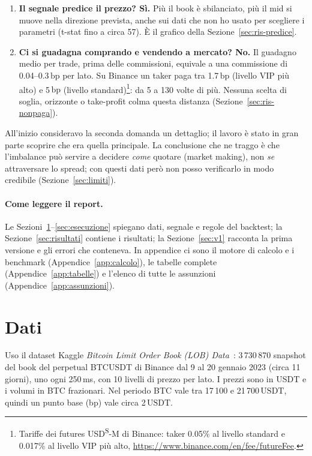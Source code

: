 \documentclass[a4paper,11pt]{article}
\newcommand{\bp}{\ensuremath{\,\mathrm{bp}}}
\newcommand{\usdt}{\ensuremath{\,\mathrm{USDT}}}
\begin{document}
\begin{enumerate}[leftmargin=*]
  \item \textbf{Il segnale predice il prezzo? Sì.} Più il book è sbilanciato, più il mid si
        muove nella direzione prevista, anche sui dati che non ho usato per scegliere i
        parametri (t-stat fino a circa 57). È il grafico della Sezione~\ref{sec:ris-predice}.
  \item \textbf{Ci si guadagna comprando e vendendo a mercato? No.} Il guadagno medio per
        trade, prima delle commissioni, equivale a una commissione di 0.04--0.3\bp{} per lato.
        Su Binance un taker paga tra 1.7\bp{} (livello VIP più alto) e 5\bp{} (livello
        standard)\footnote{Tariffe dei futures USD\textsuperscript{\tiny S}-M di Binance: taker
        0.05\% al livello standard e 0.017\% al livello VIP più alto,
        \url{https://www.binance.com/en/fee/futureFee}.}: da 5 a 130 volte di più. Nessuna
        scelta di soglia, orizzonte o take-profit colma questa distanza
        (Sezione~\ref{sec:ris-nonpaga}).
\end{enumerate}

All'inizio consideravo la seconda domanda un dettaglio; il lavoro è stato in gran parte
scoprire che era quella principale. La conclusione che ne traggo è che l'imbalance può servire
a decidere \emph{come} quotare (market making), non \emph{se} attraversare lo spread; con questi
dati però non posso verificarlo in modo credibile (Sezione~\ref{sec:limiti}).

\paragraph{Come leggere il report.} Le Sezioni~\ref{sec:dati}--\ref{sec:esecuzione} spiegano
dati, segnale e regole del backtest; la Sezione~\ref{sec:risultati} contiene i risultati; la
Sezione~\ref{sec:v1} racconta la prima versione e gli errori che conteneva. In appendice ci sono
il motore di calcolo e i benchmark (Appendice~\ref{app:calcolo}), le tabelle complete
(Appendice~\ref{app:tabelle}) e l'elenco di tutte le assunzioni (Appendice~\ref{app:assunzioni}).

\section{Dati}
\label{sec:dati}

Uso il dataset Kaggle \emph{Bitcoin Limit Order Book (LOB) Data}~\cite{kaggle}: 3\,730\,870
snapshot del book del perpetual BTCUSDT di Binance dal 9 al 20 gennaio 2023 (circa 11 giorni),
uno ogni 250\,ms, con 10 livelli di prezzo per lato. I prezzi sono in USDT e i volumi in BTC
frazionari. Nel periodo BTC vale tra 17\,100 e 21\,700\usdt{}, quindi un punto base (bp) vale
circa 2\usdt{}.
\end{document}
